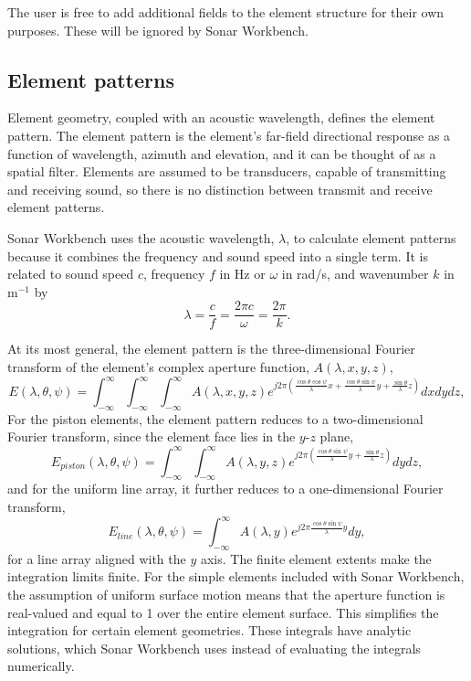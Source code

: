 

The user is free to add additional fields to the element structure for their own purposes. These will be ignored by Sonar Workbench.

\subsection{Element patterns}

Element geometry, coupled with an acoustic wavelength, defines the element pattern. The element pattern is the element's far-field directional response as a function of wavelength, azimuth and elevation, and it can be thought of as a spatial filter. Elements are assumed to be transducers, capable of transmitting and receiving sound, so there is no distinction between transmit and receive element patterns. 

Sonar Workbench uses the acoustic wavelength, $\lambda$, to calculate element patterns because it combines the frequency and sound speed into a single term. It is related to sound speed $c$, frequency $f$ in Hz or $\omega$ in rad/s, and wavenumber $k$ in m$^{-1}$ by
\begin{equation*}
\lambda = \frac{c}{f} = \frac{2\pi{c}}{\omega} = \frac{2\pi}{k}.
\end{equation*}

At its most general, the element pattern is the three-dimensional Fourier transform of the element's complex aperture function, $A(\lambda,x,y,z)$,
\begin{equation}
E(\lambda,\theta,\psi) = \int_{-\infty}^\infty\int_{-\infty}^\infty\int_{-\infty}^\infty A(\lambda,x,y,z)e^{j2\pi\left(\frac{\cos\theta\cos\psi}{\lambda}x + \frac{\cos\theta\sin\psi}{\lambda}y + \frac{\sin\theta}{\lambda}z\right)}dxdydz,\label{eq:VolumetricFT}
\end{equation}
For the piston elements, the element pattern reduces to a two-dimensional Fourier transform, since the element face lies in the $y$-$z$ plane,
\begin{equation}
E_{piston}(\lambda,\theta,\psi) = \int_{-\infty}^\infty\int_{-\infty}^\infty A(\lambda,y,z)e^{j2\pi\left(\frac{\cos\theta\sin\psi}{\lambda}y + \frac{\sin\theta}{\lambda}z\right)}dydz,\label{eq:PlanarFT}
\end{equation}
and for the uniform line array, it further reduces to a one-dimensional Fourier transform,
\begin{equation}
E_{line}(\lambda,\theta,\psi) = \int_{-\infty}^\infty A(\lambda,y)e^{j2\pi\frac{\cos\theta\sin\psi}{\lambda}y}dy,\label{eq:LinearFT}
\end{equation}
for a line array aligned with the $y$ axis. The finite element extents make the integration limits finite. For the simple elements included with Sonar Workbench, the assumption of uniform surface motion means that the aperture function is real-valued and equal to 1 over the entire element surface. This simplifies the integration for certain element geometries. These integrals have analytic solutions, which Sonar Workbench uses instead of evaluating the integrals numerically.

